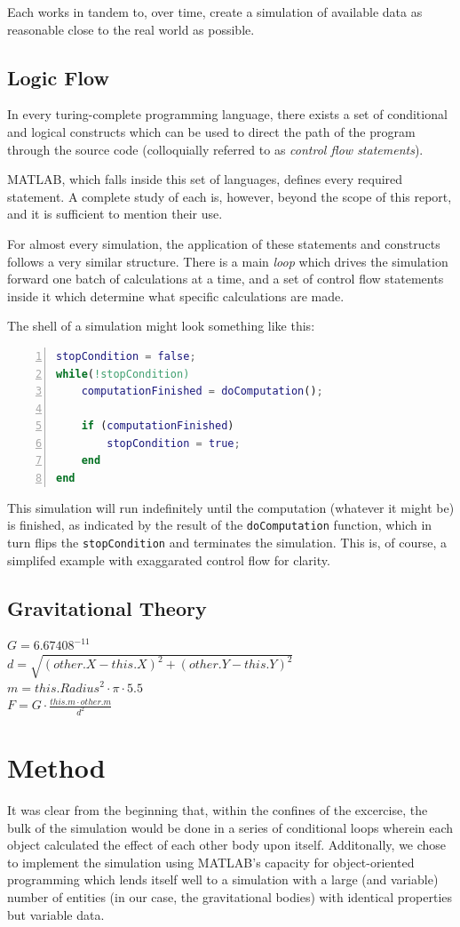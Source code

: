 \documentclass[11pt]{article}
\begin{document}
Each works in tandem to, over time, create a simulation of available data as reasonable close to the real 
world as possible.
\subsection{Logic Flow}
In every turing-complete programming language, there exists a set of conditional and logical constructs
which can be used to direct the path of the program through the source code (colloquially referred to as \emph{control flow statements}). 

MATLAB, which falls inside this set of languages, defines every required statement. A complete study of each is, however, beyond the scope of this report, and it is sufficient to mention their use.

For almost every simulation, the application of these statements and constructs follows a very similar structure. There is a main \emph{loop} which drives the simulation forward one batch of calculations at a time, and a set of control flow statements inside it which determine what specific calculations are made.

The shell of a simulation might look something like this:
\begin{lstlisting}[language=Matlab, tabsize=4, numbers=left, frame=shadowbox]
stopCondition = false;
while(!stopCondition)
	computationFinished = doComputation();
	
	if (computationFinished)
		stopCondition = true;
	end
end
\end{lstlisting}
This simulation will run indefinitely until the computation (whatever it might be) is finished, as indicated by
the result of the \verb|doComputation| function, which in turn flips the \verb|stopCondition| and terminates the 
simulation. This is, of course, a simplifed example with exaggarated control flow for clarity.

\subsection{Gravitational Theory}
$G = 6.67408^{-11}$\\
$d = \sqrt{(other.X - this.X)^{2} + (other.Y - this.Y)^{2}}$\\
$m = this.Radius^{2} \cdot \pi \cdot 5.5$\\
$F = G \cdot \frac{this.m \cdot other.m}{d^{2}}$

\pagebreak
\section{Method}
It was clear from the beginning that, within the confines of the excercise, the bulk of the simulation would be done in a series of conditional loops wherein each object calculated the effect of each other body upon itself. Additonally, we chose to implement the simulation using MATLAB's capacity for object-oriented programming which lends itself well to a simulation with a large (and variable) number of entities (in our case, the gravitational bodies) with identical properties but variable data.
\end{document}
